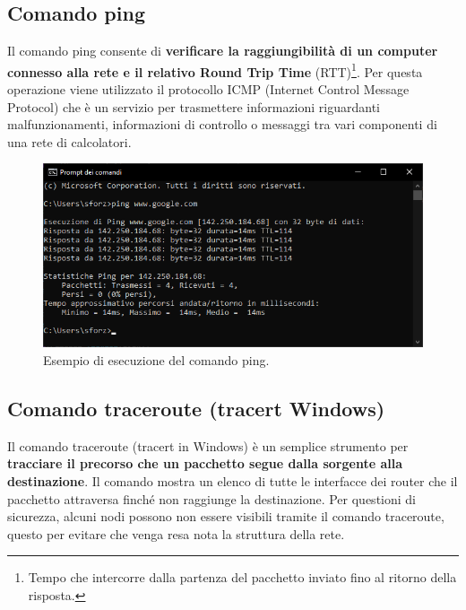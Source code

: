 \documentclass[a4paper]{article}
\begin{document}
	\subsection{Comando \textsf{ping}}
	
	Il comando \textcolor{Red3}{\textsf{ping}} consente di \textbf{verificare la raggiungibilità di un computer connesso alla rete e il relativo Round Trip Time} (RTT)\footnote{Tempo che intercorre dalla partenza del pacchetto inviato fino al ritorno della risposta.}. Per questa operazione viene utilizzato il protocollo ICMP (Internet Control Message Protocol) che è un servizio per trasmettere informazioni riguardanti malfunzionamenti, informazioni di controllo o messaggi tra vari componenti di una rete di calcolatori.
	
	\begin{figure}[!htp]
		\centering
		\includegraphics[width=\textwidth]{img/altri-strumenti/ping.png}
		\caption{Esempio di esecuzione del comando \textsf{ping}.}
	\end{figure}\newpage
	
	\subsection{Comando \textsf{traceroute} (\textsf{tracert} Windows)}
	
	Il comando \textcolor{Red3}{\textsf{traceroute}} (\textsf{tracert} in Windows) è un semplice strumento per \textbf{tracciare il precorso che un pacchetto segue dalla sorgente alla destinazione}. Il comando mostra un elenco di tutte le interfacce dei router che il pacchetto attraversa finché non raggiunge la destinazione. Per questioni di sicurezza, alcuni nodi possono non essere visibili tramite il comando \textsf{traceroute}, questo per evitare che venga resa nota la struttura della rete.
	
\end{document}
